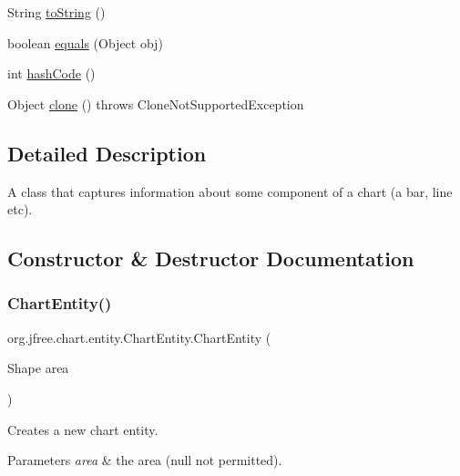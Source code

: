 \begin{DoxyCompactItemize}
\item 
String \mbox{\hyperlink{classorg_1_1jfree_1_1chart_1_1entity_1_1_chart_entity_a9e3f3665275502c0424bead57fb38096}{to\+String}} ()
\item 
boolean \mbox{\hyperlink{classorg_1_1jfree_1_1chart_1_1entity_1_1_chart_entity_a7457c5c69156940e82acfcffae0d87d4}{equals}} (Object obj)
\item 
int \mbox{\hyperlink{classorg_1_1jfree_1_1chart_1_1entity_1_1_chart_entity_a8250dabed01efc94567afb592beb75dc}{hash\+Code}} ()
\item 
Object \mbox{\hyperlink{classorg_1_1jfree_1_1chart_1_1entity_1_1_chart_entity_a2c4564d483fe3d847a84cb6119e8c4fa}{clone}} ()  throws Clone\+Not\+Supported\+Exception 
\end{DoxyCompactItemize}


\subsection{Detailed Description}
A class that captures information about some component of a chart (a bar, line etc). 

\subsection{Constructor \& Destructor Documentation}
\mbox{\label{classorg_1_1jfree_1_1chart_1_1entity_1_1_chart_entity_a18114a552c6ec66ceefe8b2599f087c2}} 
\subsubsection{\texorpdfstring{Chart\+Entity()}{ChartEntity()}\hspace{0.1cm}{\footnotesize\ttfamily [1/3]}}
{\footnotesize\ttfamily org.\+jfree.\+chart.\+entity.\+Chart\+Entity.\+Chart\+Entity (\begin{DoxyParamCaption}\item[{Shape}]{area }\end{DoxyParamCaption})}

Creates a new chart entity.


\begin{DoxyParams}{Parameters}
{\em area} & the area ({\ttfamily null} not permitted). \\
\hline
\end{DoxyParams}
\mbox{\label{classorg_1_1jfree_1_1chart_1_1entity_1_1_chart_entity_a205d59fbee04bb5787d044b68dd42d07}} 
